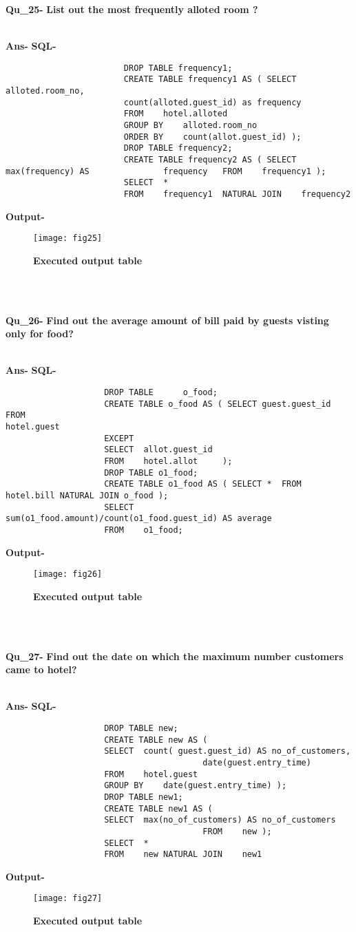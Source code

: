 \documentclass[a4,12pt]{report}
\begin{document}
\newpage
\textbf{Qu\_25-}  \textbf{List out the most frequently alloted room ?} \\\

\textbf{Ans-}		\textbf{SQL-}
\begin{lstlisting}
						DROP TABLE frequency1;
						CREATE TABLE frequency1 AS ( SELECT alloted.room_no,
						count(alloted.guest_id) as frequency
						FROM 	hotel.alloted
						GROUP BY	alloted.room_no
						ORDER BY	count(allot.guest_id) );
						DROP TABLE frequency2;
						CREATE TABLE frequency2 AS ( SELECT	max(frequency) AS 				frequency	FROM	frequency1 );
						SELECT	*
						FROM	frequency1	NATURAL JOIN	frequency2
\end{lstlisting}
\textbf{Output-} \\			   
\begin{figure}[hbtp]
\centering
\texttt{[image: fig25]}
\caption{\textbf{{\color{red}Executed output table}}}
\end{figure}
\\\

\textbf{Qu\_26-}  \textbf{Find out the average amount of bill paid by guests visting only for food?} \\\

\textbf{Ans-}		\textbf{SQL-}
\begin{lstlisting}
					DROP TABLE 		o_food;
					CREATE TABLE o_food AS ( SELECT guest.guest_id FROM 														hotel.guest	
					EXCEPT	
					SELECT 	allot.guest_id
					FROM 	hotel.allot 	);
					DROP TABLE o1_food;
					CREATE TABLE o1_food AS ( SELECT *	FROM	hotel.bill NATURAL JOIN	o_food );      
					SELECT	sum(o1_food.amount)/count(o1_food.guest_id) AS average
					FROM	o1_food;
\end{lstlisting}
\textbf{Output-} \\			   
\begin{figure}[hbtp]
\centering
\texttt{[image: fig26]}
\caption{\textbf{{\color{red}Executed output table}}}
\end{figure}
\\\

\textbf{Qu\_27-}  \textbf{Find out the date on which the maximum number customers came to hotel?} \\\

\textbf{Ans-}		\textbf{SQL-}
\begin{lstlisting}
					DROP TABLE new;
					CREATE TABLE new AS (
					SELECT 	count( guest.guest_id) AS no_of_customers,
										date(guest.entry_time)
					FROM 	hotel.guest
					GROUP BY	date(guest.entry_time) );
					DROP TABLE new1;
					CREATE TABLE new1 AS (
					SELECT	max(no_of_customers) AS no_of_customers
										FROM	new );
					SELECT	*
					FROM	new	NATURAL JOIN	new1
\end{lstlisting}
\textbf{Output-} \\			   
\begin{figure}[hbtp]
\centering
\texttt{[image: fig27]}
\caption{\textbf{{\color{red}Executed output table}}}
\end{figure}
\\\
\end{document}
